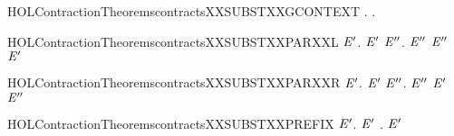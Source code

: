 \newcommand{\HOLContractionTheoremscontractsXXrules}{\UseVerbatim{HOLContractionTheoremscontractsXXrules}}
\begin{SaveVerbatim}{HOLContractionTheoremscontractsXXSUBSTXXGCONTEXT}
\HOLTokenTurnstile{} \HOLSymConst{\HOLTokenForall{}} .    \HOLSymConst{\HOLTokenImp{}} \HOLSymConst{\HOLTokenForall{}}.   \HOLSymConst{\HOLTokenImp{}}     
\end{SaveVerbatim}
\newcommand{\HOLContractionTheoremscontractsXXSUBSTXXGCONTEXT}{\UseVerbatim{HOLContractionTheoremscontractsXXSUBSTXXGCONTEXT}}
\begin{SaveVerbatim}{HOLContractionTheoremscontractsXXSUBSTXXPARXXL}
\HOLTokenTurnstile{} \HOLSymConst{\HOLTokenForall{}} \ensuremath{\HOLBoundVar{E}\sp{\prime{}}}.   \ensuremath{\HOLBoundVar{E}\sp{\prime{}}} \HOLSymConst{\HOLTokenImp{}} \HOLSymConst{\HOLTokenForall{}}\ensuremath{\HOLBoundVar{E}\sp{\prime{}\prime{}}}. \ensuremath{\HOLBoundVar{E}\sp{\prime{}\prime{}}} \HOLSymConst{\ensuremath{\mid}}   \ensuremath{\HOLBoundVar{E}\sp{\prime{}\prime{}}} \HOLSymConst{\ensuremath{\mid}} \ensuremath{\HOLBoundVar{E}\sp{\prime{}}}
\end{SaveVerbatim}
\newcommand{\HOLContractionTheoremscontractsXXSUBSTXXPARXXL}{\UseVerbatim{HOLContractionTheoremscontractsXXSUBSTXXPARXXL}}
\begin{SaveVerbatim}{HOLContractionTheoremscontractsXXSUBSTXXPARXXR}
\HOLTokenTurnstile{} \HOLSymConst{\HOLTokenForall{}} \ensuremath{\HOLBoundVar{E}\sp{\prime{}}}.   \ensuremath{\HOLBoundVar{E}\sp{\prime{}}} \HOLSymConst{\HOLTokenImp{}} \HOLSymConst{\HOLTokenForall{}}\ensuremath{\HOLBoundVar{E}\sp{\prime{}\prime{}}}.  \HOLSymConst{\ensuremath{\mid}} \ensuremath{\HOLBoundVar{E}\sp{\prime{}\prime{}}}  \ensuremath{\HOLBoundVar{E}\sp{\prime{}}} \HOLSymConst{\ensuremath{\mid}} \ensuremath{\HOLBoundVar{E}\sp{\prime{}\prime{}}}
\end{SaveVerbatim}
\newcommand{\HOLContractionTheoremscontractsXXSUBSTXXPARXXR}{\UseVerbatim{HOLContractionTheoremscontractsXXSUBSTXXPARXXR}}
\begin{SaveVerbatim}{HOLContractionTheoremscontractsXXSUBSTXXPREFIX}
\HOLTokenTurnstile{} \HOLSymConst{\HOLTokenForall{}} \ensuremath{\HOLBoundVar{E}\sp{\prime{}}}.   \ensuremath{\HOLBoundVar{E}\sp{\prime{}}} \HOLSymConst{\HOLTokenImp{}} \HOLSymConst{\HOLTokenForall{}}. \HOLSymConst{\ensuremath{\ldotp}}  \HOLSymConst{\ensuremath{\ldotp}}\ensuremath{\HOLBoundVar{E}\sp{\prime{}}}
\end{SaveVerbatim}
